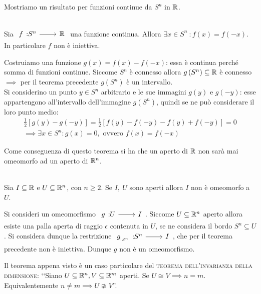 Mostriamo un risultato per funzioni continue da $S^n$ in $\mathbb{R}$.
\begin{theorema}~{}\label{non iniettività S^n in realset}\\
Sia $\funz f {S^n} \realset$ una funzione continua. Allora $\exists x\in S^n \ \colon f(x)=f(-x)$. In particolare $f$ non è iniettiva.
\end{theorema}
\begin{demonstration}
	Costruiamo una funzione $g(x)=f(x)-f(-x)$: essa è continua perché somma di funzioni continue. Siccome $S^n$ è connesso allora $g\left( S^n\right)\subseteq\mathbb{R}$ è connesso $\implies$ per il teorema precedente $g\left(S^n\right)$ è un intervallo.\\
	Si considerino un punto $y\in S^n$ arbitrario e le sue immagini $g(y)$ e $g(-y)$: esse appartengono all'intervallo dell'immagine $g\left( S^n\right)$, quindi se ne può considerare il loro punto medio:
		\begin{gather*}
			\frac{1}{2}\left[ g(y) - g(-y)\right]=\frac{1}{2} \left[ f(y) -f(-y) - f(y) +f(-y) \right]= 0\\
			\implies \exists x\in S^n \colon g(x)=0, \text{ ovvero } f(x)=f(-x)
		\end{gather*}
\end{demonstration}
Come conseguenza di questo teorema si ha che un aperto di $\mathbb{R}$ non sarà mai omeomorfo ad un aperto di $\mathbb{R}^n$.
\begin{theorema}~{}\\
Sia $I\subseteq\mathbb{R}$ e $U\subseteq\mathbb{R}^n$, con $n\geq 2$. Se $I,\ U$ sono aperti allora $I$ non è omeomorfo a $U$.	
\end{theorema}	
\begin{demonstration}
	Si consideri un omeomorfismo $\funz g U I$. Siccome $U\subseteq\mathbb{R}^n$ aperto allora esiste una palla aperta di raggio $\epsilon$ contenuta in $U$, se ne considera il bordo $S^n\subseteq U$. Si considera dunque la restrizione $\funz {g_{|_{S^n}}} {S^n} I$, che per il teorema precedente non è iniettiva. Dunque $g$ non è un omeomorfismo.	
\end{demonstration}

\begin{observe}
	Il teorema appena visto è un caso particolare del \textsc{teorema dell'invarianza della dimensione}: ‘‘Siano $U\subseteq\mathbb{R}^n, V\subseteq\mathbb{R}^m$ aperti. Se $U\cong V \implies n=m$. Equivalentemente $n\neq m\implies U\ncong V$''.
\end{observe}

